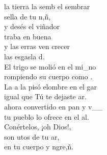 \documentclass[12pt]{article}
\begin{document}
\begin{multicols*}{2}
\begin{cancion}[El sembrador][]%
	 la tierra la semb el sembrar \\
	 sella de tu n,ñ,  \\
	y desés el viñador \\
	traba en buena  \\
	y las erras ven crecer \\
	las esgasla d.\\
	El trigo se molió en el mi_no\\
	rompiendo su cuerpo como .\\
	La a la pisó elombre en el gar\\
	igual que Tú te dejaste ar.\\
\jump
	ahora convertido en pan y v__\\
	tu pueblo lo ofrece en el al.\\
	Conértelos, ¡oh Dios!,\\
	son utos de tu ar,\\
	en tu cuerpo y ngre,ñ. \\
\end{cancion}%


\end{multicols*}
\end{document}
